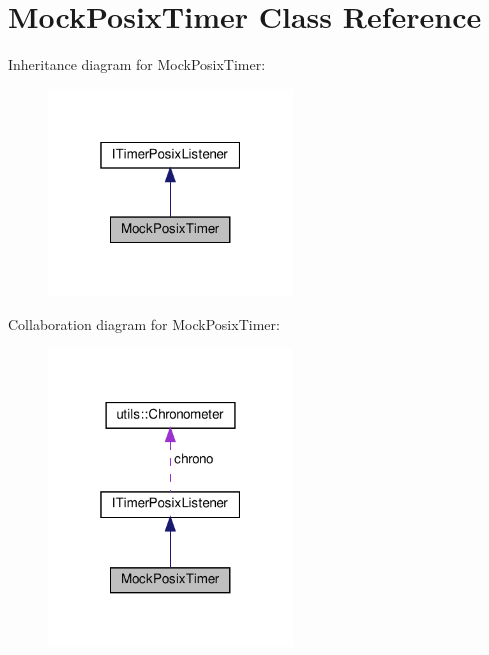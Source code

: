 \hypertarget{classMockPosixTimer}{}\section{Mock\+Posix\+Timer Class Reference}
\label{classMockPosixTimer}


Inheritance diagram for Mock\+Posix\+Timer\+:
\nopagebreak
\begin{figure}[H]
\begin{center}
\leavevmode
\includegraphics[width=184pt]{classMockPosixTimer__inherit__graph}
\end{center}
\end{figure}


Collaboration diagram for Mock\+Posix\+Timer\+:
\nopagebreak
\begin{figure}[H]
\begin{center}
\leavevmode
\includegraphics[width=184pt]{classMockPosixTimer__coll__graph}
\end{center}
\end{figure}
